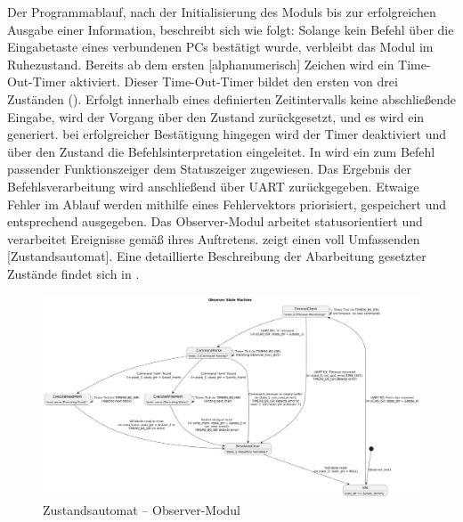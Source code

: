 Der Programmablauf, nach der Initialisierung des Moduls bis zur erfolgreichen Ausgabe einer Information, beschreibt sich wie folgt:
Solange kein Befehl \"uber die Eingabetaste eines verbundenen PCs best\"atigt wurde, verbleibt das Modul im Ruhezustand. Bereits ab dem ersten [alphanumerisch] Zeichen wird ein \glqq{}Time-Out-Timer\grqq{} aktiviert. Dieser Time-Out-Timer bildet den ersten von drei Zust\"anden (). Erfolgt innerhalb eines definierten Zeitintervalls keine abschlie{\ss}ende Eingabe, wird der Vorgang \"uber den Zustand  zur\"uckgesetzt, und es wird ein  generiert. bei erfolgreicher Best\"atigung hingegen wird der Timer deaktiviert und \"uber den Zustand  die Befehlsinterpretation eingeleitet. In  wird ein zum Befehl passender Funktionszeiger dem Statuszeiger zugewiesen. Das Ergebnis der Befehlsverarbeitung wird anschlie{\ss}end \"uber UART zur\"uckgegeben. Etwaige Fehler im Ablauf werden mithilfe eines Fehlervektors priorisiert, gespeichert und entsprechend ausgegeben. Das Observer-Modul arbeitet statusorientiert und verarbeitet Ereignisse gem\"a{\ss} ihres Auftretens.  zeigt einen voll Umfassenden [Zustandsautomat].
Eine detaillierte Beschreibung der Abarbeitung gesetzter Zust\"ande findet sich in .

\begin{figure}[h!]
	\centering
	\includegraphics[width=1.0\textwidth]{../Bilder/observer_state_machine.png}
	\caption{Zustandsautomat -- Observer-Modul}
	\label{fig:StateMachine_ObserverModul}
\end{figure}

